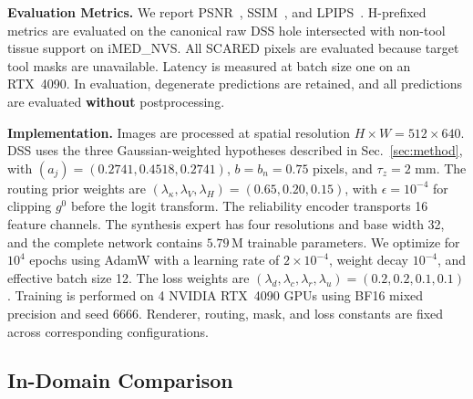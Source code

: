 \documentclass[letterpaper,10pt,conference]{ieeeconf}
\begin{document}
\textbf{Evaluation Metrics.}
We report PSNR~\cite{huynhthu2008psnr}, SSIM~\cite{wang2004ssim}, and LPIPS~\cite{zhang2018lpips}.
H-prefixed metrics are evaluated
on the canonical raw DSS hole intersected with non-tool tissue support on iMED\_NVS.
All SCARED pixels are evaluated because target tool masks are unavailable.
Latency is measured at batch size one on an
RTX~4090.
In evaluation, degenerate predictions are retained,
and all predictions are evaluated \textbf{without} postprocessing.


\textbf{Implementation.}
Images are processed at spatial resolution $H\times W=512\times640$. DSS uses
the three Gaussian-weighted hypotheses described in Sec.~\ref{sec:method}, with
$(a_j)=(0.2741,0.4518,0.2741)$, $b=b_n=0.75$ pixels, and
$\tau_z=2$ mm. The routing prior weights are
$(\lambda_\kappa,\lambda_V,\lambda_H)=(0.65,0.20,0.15)$, 
with \(\epsilon=10^{-4}\) for clipping \(g^0\) before the logit transform.
The reliability encoder
transports 16 feature channels. The synthesis expert has four resolutions and
base width 32, and the complete network contains $5.79$\,M trainable
parameters. We optimize for $10^{4}$ epochs using AdamW with a learning rate of
$2\times10^{-4}$, weight decay $10^{-4}$, and effective batch size 12. The loss
weights are $(\lambda_d,\lambda_c,\lambda_r,\lambda_u)=(0.2,0.2,0.1,0.1)$.
Training
is performed on 4 NVIDIA RTX~4090 GPUs using BF16 mixed precision and seed
6666. Renderer, routing, mask, and loss constants are fixed across corresponding
configurations.

\subsection{In-Domain Comparison}
\end{document}

